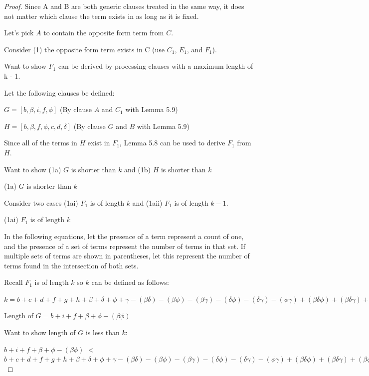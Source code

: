 \documentclass[manuscript]{acmart}
\begin{document}
\begin{proof}
        Since A and B are both generic clauses treated in the same way, it does not matter which clause the term exists in as long as it is fixed.
        
        Let's pick $A$ to contain the opposite form term from $C$.
        
        Consider (1) the opposite form term exists in C (use $C_1$, $E_1$, and $F_1$).

        Want to show $F_1$ can be derived by processing clauses with a maximum length of k - 1.

        Let the following clauses be defined:

        $G = [b, \beta, i, f, \phi]$ (By clause $A$ and $C_1$ with Lemma 5.9)

        $H = [b, \beta, f, \phi, c, d, \delta]$ (By clause $G$ and $B$ with Lemma 5.9)

        Since all of the terms in $H$ exist in $F_1$, Lemma 5.8 can be used to derive $F_1$ from $H$.

        Want to show (1a) $G$ is shorter than $k$ and (1b) $H$ is shorter than $k$

        (1a) $G$ is shorter than $k$

        Consider two cases (1ai) $F_1$ is of length $k$ and (1aii) $F_1$ is of length $k-1$.

        (1ai) $F_1$ is of length $k$

        In the following equations, let the presence of a term represent a count of one, and the presence of a set of terms represent the number of terms in that set. If multiple sets of terms are shown in parentheses, let this represent the number of terms found in the intersection of both sets.
        
        Recall $F_1$ is of length $k$ so $k$ can be defined as follows:
        
        $k = b + c + d + f + g + h 
        + \beta + \delta + \phi + \gamma
        - (\beta \delta) - (\beta \phi) - (\beta \gamma) - (\delta \phi) - (\delta \gamma) - (\phi \gamma)
        + (\beta \delta \phi) + (\beta \delta \gamma) + (\beta \phi \gamma) + (\delta \phi \gamma)
        - (\beta \delta \phi \gamma)
        $

        Length of $G = b + i + f + \beta + \phi - (\beta \phi)$

        Want to show length of $G$ is less than $k$:

        $b + i + f + \beta + \phi - (\beta \phi)$
        $<$
        $b + c + d + f + g + h 
        + \beta + \delta + \phi + \gamma
        - (\beta \delta) - (\beta \phi) - (\beta \gamma) - (\delta \phi) - (\delta \gamma) - (\phi \gamma)
        + (\beta \delta \phi) + (\beta \delta \gamma) + (\beta \phi \gamma) + (\delta \phi \gamma)
        - (\beta \delta \phi \gamma) 
        $


\end{proof}
\end{document}

